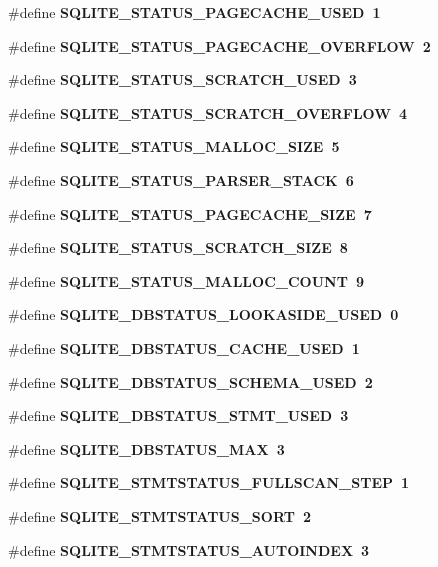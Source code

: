 \begin{CompactItemize}
$$\item 
\#define \bf{SQLITE\_\-STATUS\_\-PAGECACHE\_\-USED}~1
\item 
\#define \bf{SQLITE\_\-STATUS\_\-PAGECACHE\_\-OVERFLOW}~2
\item 
\#define \bf{SQLITE\_\-STATUS\_\-SCRATCH\_\-USED}~3
\item 
\#define \bf{SQLITE\_\-STATUS\_\-SCRATCH\_\-OVERFLOW}~4
\item 
\#define \bf{SQLITE\_\-STATUS\_\-MALLOC\_\-SIZE}~5
\item 
\#define \bf{SQLITE\_\-STATUS\_\-PARSER\_\-STACK}~6
\item 
\#define \bf{SQLITE\_\-STATUS\_\-PAGECACHE\_\-SIZE}~7
\item 
\#define \bf{SQLITE\_\-STATUS\_\-SCRATCH\_\-SIZE}~8
\item 
\#define \bf{SQLITE\_\-STATUS\_\-MALLOC\_\-COUNT}~9
\item 
\#define \bf{SQLITE\_\-DBSTATUS\_\-LOOKASIDE\_\-USED}~0
\item 
\#define \bf{SQLITE\_\-DBSTATUS\_\-CACHE\_\-USED}~1
\item 
\#define \bf{SQLITE\_\-DBSTATUS\_\-SCHEMA\_\-USED}~2
\item 
\#define \bf{SQLITE\_\-DBSTATUS\_\-STMT\_\-USED}~3
\item 
\#define \bf{SQLITE\_\-DBSTATUS\_\-MAX}~3
\item 
\#define \bf{SQLITE\_\-STMTSTATUS\_\-FULLSCAN\_\-STEP}~1
\item 
\#define \bf{SQLITE\_\-STMTSTATUS\_\-SORT}~2
\item 
\#define \bf{SQLITE\_\-STMTSTATUS\_\-AUTOINDEX}~3
\end{CompactItemize}
